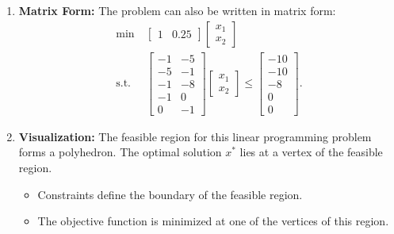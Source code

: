 \begin{example}
\begin{enumerate}
        \item \textbf{Matrix Form:}  
        The problem can also be written in matrix form:
        \[
        \begin{aligned}
            \min \ & \begin{bmatrix} 1 & 0.25 \end{bmatrix} \begin{bmatrix} x_1 \\ x_2 \end{bmatrix} \\
            \text{s.t.} \ & 
            \begin{bmatrix}
            -1 & -5 \\
            -5 & -1 \\
            -1 & -8 \\
            -1 & 0 \\
            0 & -1
            \end{bmatrix}
            \begin{bmatrix} x_1 \\ x_2 \end{bmatrix} \leq
            \begin{bmatrix}
            -10 \\ -10 \\ -8 \\ 0 \\ 0
            \end{bmatrix}.
        \end{aligned}
        \]
    
        \item \textbf{Visualization:}  
        The feasible region for this linear programming problem forms a polyhedron. The optimal solution \(x^*\) lies at a vertex of the feasible region. 
        \begin{itemize}
            \item Constraints define the boundary of the feasible region.
            \item The objective function is minimized at one of the vertices of this region.
        \end{itemize}
    \end{enumerate}
\end{example}

